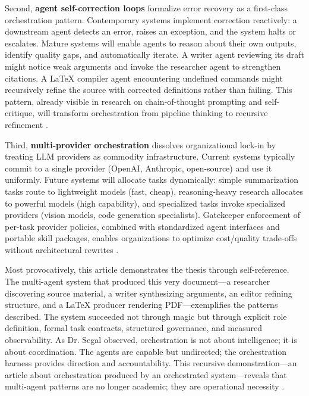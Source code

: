 Second, \textbf{agent self-correction loops} formalize error recovery as a first-class orchestration pattern. Contemporary systems implement correction reactively: a downstream agent detects an error, raises an exception, and the system halts or escalates. Mature systems will enable agents to reason about their own outputs, identify quality gaps, and automatically iterate. A writer agent reviewing its draft might notice weak arguments and invoke the researcher agent to strengthen citations. A LaTeX compiler agent encountering undefined commands might recursively refine the source with corrected definitions rather than failing. This pattern, already visible in research on chain-of-thought prompting and self-critique, will transform orchestration from pipeline thinking to recursive refinement \cite{WeiEtAl2022, Shinn2023}.

Third, \textbf{multi-provider orchestration} dissolves organizational lock-in by treating LLM providers as commodity infrastructure. Current systems typically commit to a single provider (OpenAI, Anthropic, open-source) and use it uniformly. Future systems will allocate tasks dynamically: simple summarization tasks route to lightweight models (fast, cheap), reasoning-heavy research allocates to powerful models (high capability), and specialized tasks invoke specialized providers (vision models, code generation specialists). Gatekeeper enforcement of per-task provider policies, combined with standardized agent interfaces and portable skill packages, enables organizations to optimize cost/quality trade-offs without architectural rewrites \cite{Anthropic2024b}.

Most provocatively, this article demonstrates the thesis through self-reference. The multi-agent system that produced this very document—a researcher discovering source material, a writer synthesizing arguments, an editor refining structure, and a LaTeX producer rendering PDF—exemplifies the patterns described. The system succeeded not through magic but through explicit role definition, formal task contracts, structured governance, and measured observability. As Dr. Segal observed, orchestration is not about intelligence; it is about coordination. The agents are capable but undirected; the orchestration harness provides direction and accountability. This recursive demonstration—an article about orchestration produced by an orchestrated system—reveals that multi-agent patterns are no longer academic; they are operational necessity \cite{Segal2026}.

\nocite{AutoGen2023,Wang2023,WeiEtAl2022,Shinn2023,WooldridgeJennings1995,AMS2023}